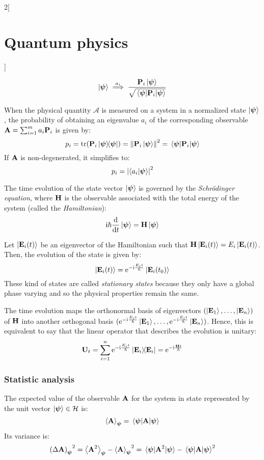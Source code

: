 \documentclass[../../../main_physics.tex]{subfiles}
\begin{document}
\begin{multicols}{2}[\section{Quantum physics}]
\begin{definition}
    $$\ket{\boldsymbol{\mathrm{\psi}}}\overset{a_i}{\implies}\frac{\boldsymbol{\mathrm{P}}_i\ket{\boldsymbol{\mathrm{\psi}}}}{\sqrt{\mel{\boldsymbol{\mathrm{\psi}}}{\boldsymbol{\mathrm{P}}_i}{\boldsymbol{\mathrm{\psi}}}}}$$
  \end{definition}
  \begin{definition}[Postulate IV]
    When the physical quantity $\mathcal{A}$ is measured on a system in a normalized state $\ket{\boldsymbol{\mathrm{\psi}}}$, the probability of obtaining an eigenvalue $a_i$ of the corresponding observable $\boldsymbol{\mathrm{A}}=\sum_{i=1}^ma_i\boldsymbol{\mathrm{P}}_i$ is given by:
    $$p_i=\trace(\vf{P}_i\dyad{\vf\psi}{\vf\psi})={\norm{\vf{P}_i\ket{\vf\psi}}}^2=\mel{\vf\psi}{\vf{P}_i}{\vf\psi}$$
    If $\boldsymbol{\mathrm{A}}$ is non-degenerated, it simplifies to: $$p_i={\abs{\braket{a_i}{\boldsymbol{\mathrm{\psi}}}}}^2$$
  \end{definition}
  \begin{definition}[Postulate V]
    The time evolution of the state vector $\ket{\boldsymbol{\mathrm{\psi}}}$ is governed by the \emph{Schrödinger equation}, where $\boldsymbol{\mathrm{H}}$ is the observable associated with the total energy of the system (called the \emph{Hamiltonian}): $$\mathrm{i} \hbar\dv{}{t}\ket{\boldsymbol{\mathrm{\psi}}}=\boldsymbol{\mathrm{H}}\ket{\boldsymbol{\mathrm{\psi}}}$$
  \end{definition}
  \begin{proposition}
    Let $\ket{\boldsymbol{\mathrm{E}}_i(t)}$ be an eigenvector of the Hamiltonian such that $\boldsymbol{\mathrm{H}}\ket{\boldsymbol{\mathrm{E}}_i(t)}=E_i\ket{\boldsymbol{\mathrm{E}}_i(t)}$. Then, the evolution of the state is given by: $$\ket{\boldsymbol{\mathrm{E}}_i(t)}=\mathrm{e}^{-\mathrm{i}\frac{E_i t}{\hbar}}\ket{\boldsymbol{\mathrm{E}}_i(t_0)}$$ These kind of states are called \emph{stationary states} because they only have a global phase varying and so the physical properties remain the same.
  \end{proposition}
  \begin{proposition}
    The time evolution maps the orthonormal basis of eigenvectors $(\ket{\boldsymbol{\mathrm{E}}_1},\ldots,\ket{\boldsymbol{\mathrm{E}}_n})$ of $\boldsymbol{\mathrm{H}}$ into another orthogonal basis $(\mathrm{e}^{-\mathrm{i}\frac{E_it}{\hbar}}\ket{\boldsymbol{\mathrm{E}}_1},\ldots,\mathrm{e}^{-\mathrm{i}\frac{E_it}{\hbar}}\ket{\boldsymbol{\mathrm{E}}_n})$. Hence, this is equivalent to say that the linear operator that describes the evolution is unitary: $$\vf{U}_t=\sum_{i=1}^n\exp{-\ii\frac{E_it}{\hbar}}\dyad{\vf{E}_i}=\exp{-\ii\frac{\vf{H}t}{\hbar}}$$
  \end{proposition}
  \subsubsection{Statistic analysis}
  \begin{proposition}
    The expected value of the observable $\boldsymbol{\mathrm{A}}$ for the system in state represented by the unit vector $\ket{\boldsymbol{\mathrm{\psi}}}\in\mathcal{H}$ is: $$\ev{\vf{A}}_{\vf\psi}=\ev{\vf{A}}{\vf\psi}$$
    Its variance is: $${{(\Delta\vf{A})}_{\vf\psi}}^2=\ev{\vf{A}^2}_{\vf\psi}-{\ev{\vf{A}}_{\vf\psi}}^2=\ev{\vf{A}^2}{\vf\psi}-\ev{\vf{A}}{\vf\psi}^2$$
  \end{proposition}

\end{multicols}
\end{document}

